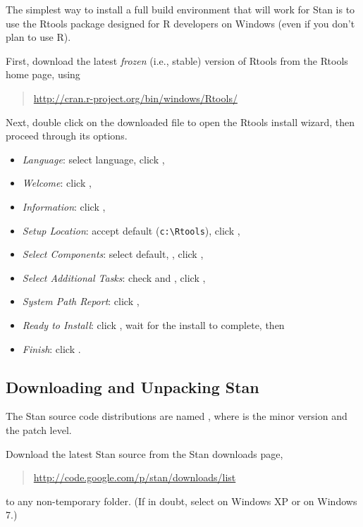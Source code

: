 The simplest way to install a full \Cpp build environment that will
work for Stan is to use the Rtools package designed for R developers
on Windows (even if you don't plan to use R).

First, download the latest \emph{frozen} (i.e., stable) version of
Rtools from the Rtools home page, using
%
\begin{quote}
\url{http://cran.r-project.org/bin/windows/Rtools/}
\end{quote}

Next, double click on the downloaded file to open the Rtools
install wizard, then proceed through its options.
\begin{itemize}
\item \emph{Language}: select language, click ,
\item \emph{Welcome}: click ,
\item \emph{Information}: click ,
\item \emph{Setup Location}: accept default (\Verb|c:\Rtools|), click ,
\item \emph{Select Components}: select default, , click ,
\item \emph{Select Additional Tasks}: check  and , click ,
\item \emph{System Path Report}: click ,
\item \emph{Ready to Install}: click , wait for the
  install to complete, then
\item \emph{Finish}: click .
\end{itemize}

\subsection{Downloading and Unpacking Stan}

The Stan source code distributions are named
, where  is the minor version and
 the patch level.

Download the latest Stan source from the Stan downloads page,
%
\begin{quote}
\url{http://code.google.com/p/stan/downloads/list}
\end{quote}
%
to any non-temporary folder.  (If in doubt, select 
on Windows XP or  on Windows 7.)  

